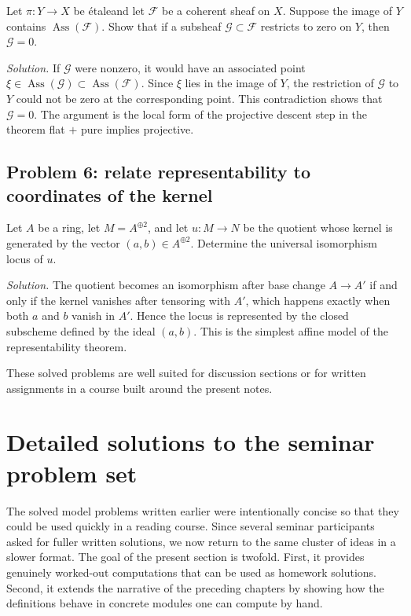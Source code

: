 \documentclass[11pt,oneside]{article}
\newcommand{\F}{\mathcal F}
\newcommand{\G}{\mathcal G}
\newcommand{\Ass}{\operatorname{Ass}}
\newcommand{\etale}{\'etale}
\begin{document}
Let $\pi\colon Y\to X$ be \etale and let $\F$ be a coherent sheaf on $X$.  Suppose the image of $Y$ contains $\Ass(\F)$.  Show that if a subsheaf $\G\subset \F$ restricts to zero on $Y$, then $\G=0$.

\emph{Solution.}  If $\G$ were nonzero, it would have an associated point $\xi\in\Ass(\G)\subset \Ass(\F)$.  Since $\xi$ lies in the image of $Y$, the restriction of $\G$ to $Y$ could not be zero at the corresponding point.  This contradiction shows that $\G=0$.  The argument is the local form of the projective descent step in the theorem flat $+$ pure implies projective.

\subsection*{Problem 6: relate representability to coordinates of the kernel}

Let $A$ be a ring, let $M=A^{\oplus 2}$, and let $u\colon M\to N$ be the quotient whose kernel is generated by the vector $(a,b)\in A^{\oplus 2}$.  Determine the universal isomorphism locus of $u$.

\emph{Solution.}  The quotient becomes an isomorphism after base change $A\to A'$ if and only if the kernel vanishes after tensoring with $A'$, which happens exactly when both $a$ and $b$ vanish in $A'$.  Hence the locus is represented by the closed subscheme defined by the ideal $(a,b)$.  This is the simplest affine model of the representability theorem.

These solved problems are well suited for discussion sections or for written assignments in a course built around the present notes.





\section{Detailed solutions to the seminar problem set}

The solved model problems written earlier were intentionally concise so that they could be used quickly in a reading course.  Since several seminar participants asked for fuller written solutions, we now return to the same cluster of ideas in a slower format.  The goal of the present section is twofold.  First, it provides genuinely worked-out computations that can be used as homework solutions.  Second, it extends the narrative of the preceding chapters by showing how the definitions behave in concrete modules one can compute by hand.
\end{document}

